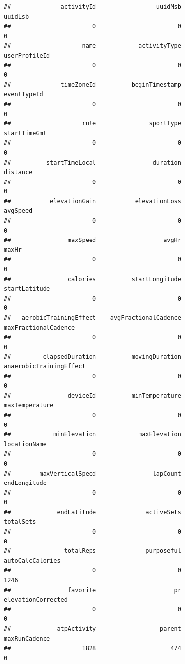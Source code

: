 \documentclass[
]{book}
\begin{document}
\begin{verbatim}
##              activityId                 uuidMsb                 uuidLsb 
##                       0                       0                       0 
##                    name            activityType           userProfileId 
##                       0                       0                       0 
##              timeZoneId          beginTimestamp             eventTypeId 
##                       0                       0                       0 
##                    rule               sportType            startTimeGmt 
##                       0                       0                       0 
##          startTimeLocal                duration                distance 
##                       0                       0                       0 
##           elevationGain           elevationLoss                avgSpeed 
##                       0                       0                       0 
##                maxSpeed                   avgHr                   maxHr 
##                       0                       0                       0 
##                calories          startLongitude           startLatitude 
##                       0                       0                       0 
##   aerobicTrainingEffect    avgFractionalCadence    maxFractionalCadence 
##                       0                       0                       0 
##         elapsedDuration          movingDuration anaerobicTrainingEffect 
##                       0                       0                       0 
##                deviceId          minTemperature          maxTemperature 
##                       0                       0                       0 
##            minElevation            maxElevation            locationName 
##                       0                       0                       0 
##        maxVerticalSpeed                lapCount            endLongitude 
##                       0                       0                       0 
##             endLatitude              activeSets               totalSets 
##                       0                       0                       0 
##               totalReps              purposeful        autoCalcCalories 
##                       0                       0                    1246 
##                favorite                      pr      elevationCorrected 
##                       0                       0                       0 
##             atpActivity                  parent           maxRunCadence 
##                    1828                     474                       0 

\end{verbatim}
\end{document}
